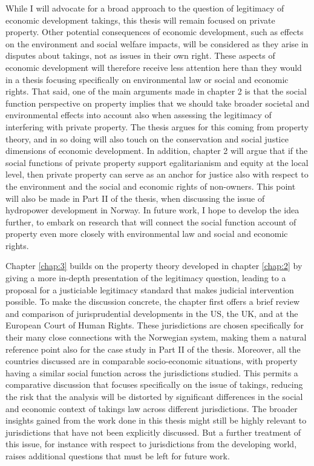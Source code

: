 While I will advocate for a broad approach to the question of legitimacy of economic development takings, this thesis will remain focused on private property. Other potential consequences of economic development, such as effects on the environment and social welfare impacts, will be considered as they arise in disputes about takings, not as issues in their own right. These aspects of economic development will therefore receive less attention here than they would in a thesis focusing specifically on environmental law or social and economic rights.  That said, one of the main arguments made in chapter 2 is that the social function perspective on property implies that we should take broader societal and environmental effects into account also when assessing the legitimacy of interfering with private property. The thesis argues for this coming from property theory, and in so doing will also touch on the conservation and social justice dimensions of economic development. In addition, chapter 2 will argue that if the social functions of private property support egalitarianism and equity at the local level, then private property can serve as an anchor for justice also with respect to the environment and the social and economic rights of non-owners. This point will also be made in Part II of the thesis, when discussing the issue of hydropower development in Norway. In future work, I hope to develop the idea further, to embark on research that will connect the social function account of property even more closely with environmental law and social and economic rights.

Chapter \ref{chap:3} builds on the property theory developed in chapter \ref{chap:2} by giving a more in-depth presentation of the legitimacy question, leading to a proposal for a justiciable legitimacy standard that makes judicial intervention possible. To make the discussion concrete, the chapter first offers a brief review and comparison of jurisprudential developments in the US, the UK, and at the European Court of Human Rights. These jurisdictions are chosen specifically for their many close connections with the Norwegian system, making them a natural reference point also for the case study in Part II of the thesis. Moreover, all the countries discussed are in comparable socio-economic situations, with property having a similar social function across the jurisdictions studied. This permits a comparative discussion that focuses specifically on the issue of takings, reducing the risk that the analysis will be distorted by significant differences in the social and economic context of takings law across different jurisdictions. The broader insights gained from the work done in this thesis might still be highly relevant to jurisdictions that have not been explicitly discussed. But a further treatment of this issue, for instance with respect to jurisdictions from the developing world, raises additional questions that must be left for future work.

